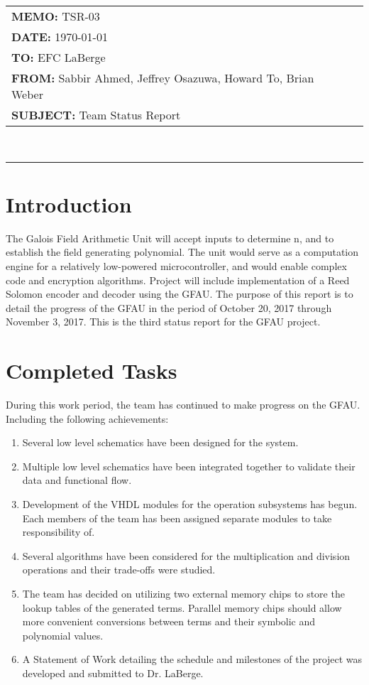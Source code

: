 \documentclass[paper=usletter, fontsize=12pt]{article}
\newcommand{\Sabbir}{Sabbir Ahmed}
\newcommand{\Jeffrey}{Jeffrey Osazuwa}
\newcommand{\Howard}{Howard To}
\newcommand{\Brian}{Brian Weber}
\newcommand{\documentinfo}[5]{
    \begin{centering}
        \parbox{6.8in}{
        \begin{spacing}{1}
            \begin{flushleft}
                \begin{tabular}{l l} #1 \\ #2 \\ #3 \\ #4 \\ #5 \\
                \end{tabular} \\
                \rule{\textwidth}{1pt}
            \end{flushleft}
        \end{spacing} }
    \end{centering} }
\begin{document}
    \documentinfo{\textbf{MEMO:} TSR-03}{\textbf{DATE: }{\today}}{\textbf{TO: }
    EFC LaBerge}{\textbf{FROM: }\Sabbir, \Jeffrey, \Howard,
    \Brian}{\textbf{SUBJECT: } Team Status Report}
    \vspace{-0.3in}

    \section{Introduction} The Galois Field Arithmetic Unit will accept inputs
    to determine n, and to establish the field generating polynomial. The unit
    would serve as a computation engine for a relatively low-powered
    microcontroller, and would enable complex code and encryption algorithms.
    Project will include implementation of a Reed Solomon encoder and decoder
    using the GFAU. The purpose of this report is to detail the progress of the
    GFAU in the period of October 20, 2017 through November 3, 2017. This is
    the third status report for the GFAU project.

    \section{Completed Tasks} During this work period, the team has continued
    to make progress on the GFAU. Including the following achievements:
    \begin{enumerate}[label=\alph*)]

        \item Several low level schematics have been designed for the system.

        \item Multiple low level schematics have been integrated together to
        validate their data and functional flow.

        \item Development of the VHDL modules for the operation subsystems has
        begun. Each members of the team has been assigned separate modules to
        take responsibility of.

        \item Several algorithms have been considered for the multiplication
        and division operations and their trade-offs were studied.

        \item The team has decided on utilizing two external memory chips to
        store the lookup tables of the generated terms. Parallel memory chips
        should allow more convenient conversions between terms and their
        symbolic and polynomial values.

        \item A Statement of Work detailing the schedule and milestones of the
        project was developed and submitted to Dr. LaBerge.

    \end{enumerate}
\end{document}
